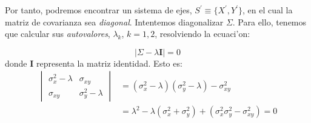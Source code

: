 Por tanto, podremos encontrar un sistema de ejes, $S^\prime\equiv\{X^\prime,Y^\prime\}$,
en el cual la matriz de covarianza sea \emph{diagonal}. Intentemos
diagonalizar $\Sigma$.  Para ello, tenemos que calcular sus 
\emph{autovalores}, $\lambda_k$, $k=1,2$, resolviendo la ecuaci'on:

\begin{equation}
  \label{eq:eigen}
  |\Sigma - \lambda \mathbf{I}| = 0
\end{equation}
% 
donde $\mathbf{I}$ representa la matriz identidad. Esto es:
%
\begin{equation}
  \label{eq:eigen2}
  \begin{split}
    \begin{vmatrix}
      \sigma_x^2-\lambda & \sigma_{xy} \\ \sigma_{xy} & \sigma_y^2-\lambda
    \end{vmatrix}
    & = (\sigma_x^2-\lambda)(\sigma_y^2-\lambda) - \sigma_{xy}^2 \\
    & = \lambda^2 - \lambda(\sigma_x^2+\sigma_y^2) + 
    (\sigma_x^2\sigma_y^2 - \sigma_{xy}^2)  = 0
  \end{split}
\end{equation}

